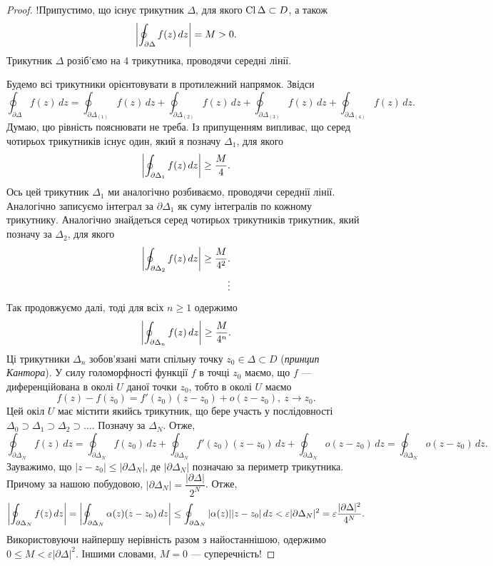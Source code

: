 \documentclass{math_library}
\begin{document}
\begin{proof}
!Припустимо, що існує трикутник $\Delta$, для якого $\operatorname{Cl} \Delta \subset D$, а також
\[
\abs{ \oint_{\partial \Delta} f(z)\,dz} = M > 0.
\]
Трикутник $\Delta$ розіб'ємо на $4$ трикутника, проводячи середні лінії.
\begin{figure}[H]
\centering
{}
\end{figure}
Будемо всі трикутники орієнтовувати в протилежний напрямок. Звідси
\[
\oint_{\partial \Delta} f(z)\,dz = \oint_{\partial \Delta_{(1)}} f(z)\,dz + \oint_{\partial \Delta_{(2)}} f(z)\,dz + \oint_{\partial \Delta_{(3)}} f(z)\,dz + \oint_{\partial \Delta_{(4)}} f(z)\,dz.
\]
Думаю, цю рівність пояснювати не треба. Із припущенням випливає, що серед чотирьох трикутників існує один, який я позначу $\Delta_1$, для якого
\[
\abs{\oint_{\partial \Delta_1} f(z)\,dz} \geq \dfrac{M}{4}.
\]
Ось цей трикутник $\Delta_1$ ми аналогічно розбиваємо, проводячи середнії лінії. Аналогічно записуємо інтеграл за $\partial \Delta_1$ як суму інтегралів по кожному трикутнику. Аналогічно знайдеться серед чотирьох трикутників трикутник, який позначу за $\Delta_2$, для якого
\begin{align*}
\abs{\oint_{\partial \Delta_2} f(z)\,dz} \geq \dfrac{M}{4^2}. \\
\vdots 
\end{align*}
Так продовжуємо далі, тоді для всіх $n \geq 1$ одержимо 
\[
\abs{\oint_{\partial \Delta_n} f(z)\,dz} \geq \dfrac{M}{4^n}.
\]
Ці трикутники $\Delta_n$ зобов'язані мати спільну точку $z_0 \in \Delta \subset D$ (\textit{принцип Кантора}). У силу голоморфності функції $f$ в точці $z_0$ маємо, що $f$ --- диференційована в околі $U$ даної точки $z_0$, тобто в околі $U$ маємо
\[
f(z) - f(z_0) = f'(z_0) (z-z_0) + o(z-z_0),\ z \to z_0.
\]
Цей окіл $U$ має містити якийсь трикутник, що бере участь у послідовності $\Delta_0 \supset \Delta_1 \supset \Delta_2 \supset \dots$. Позначу за $\Delta_N$. Отже,
\[
\oint_{\partial \Delta_N} f(z)\,dz = \oint_{\partial \Delta_N} f(z_0)\,dz + \oint_{\partial \Delta_N} f'(z_0)(z-z_0)\,dz + \oint_{\partial \Delta_N} o(z-z_0)\,dz = \oint_{\partial \Delta_N} o(z-z_0)\,dz.
\]
Зауважимо, що $|z-z_0| \leq |\partial \Delta_N|$, де $|\partial \Delta_N|$ позначаю за периметр трикутника. Причому за нашою побудовою, $|\partial \Delta_N| = \dfrac{|\partial \Delta|}{2^N}$. Отже,
\[
\abs{\oint_{\partial \Delta_N} f(z)\,dz} = \abs{\oint_{\partial \Delta_N} \alpha(z)(z-z_0)\,dz} \leq \oint_{\partial \Delta_N} |\alpha(z)| |z-z_0|\,dz  < \varepsilon |\partial \Delta_N|^2 = \varepsilon \dfrac{|\partial \Delta|^2}{4^N}.
\]
Використовуючи найпершу нерівність разом з найостаннішою, одержимо $0 \leq M < \varepsilon |\partial \Delta|^2$. Іншими словами, $M = 0$ --- суперечність!
\end{proof}
\end{document}
